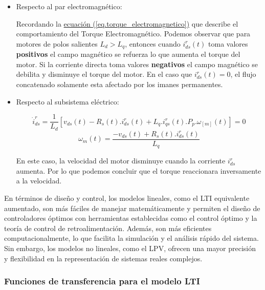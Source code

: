 \documentclass{article}
\begin{document}
\begin{itemize}
    
    \item Respecto al par electromagnético:
    
    Recordando la
    \hyperref[eq.torque_electromagnetico]{ecuación (\ref*{eq.torque_electromagnetico})}
    que describe el comportamiento del Torque Electromagnético.
    Podemos observar que para motores de polos salientes $L_{d} > L_{q}$, entonces cuando $i_{ds}^r(t)$
    toma valores \textbf{positivos} el campo magnético se refuerza lo que aumenta el torque del
    motor. Si la corriente directa toma valores \textbf{negativos} el campo magnético se debilita 
    y disminuye el torque del motor. En el caso que $i_{ds}^r(t) = 0$, el flujo concatenado solamente esta afectado por 
    los imanes permanentes.

    \item Respecto al subsistema eléctrico:

    \begin{equation}
        \dot{i}_{ds}^r = \frac{1}{L_{d}}[v_{ds}(t) - R_{s}(t).i_{ds}^r(t) + L_{q}.i_{qs}^r(t).P_{p}.\omega_[m](t)] = 0
    \end{equation}
    \begin{equation}
        \omega_{m}(t) = \frac{-v_{ds}(t) + R_{s}(t).i_{ds}^r(t)}{L_{q}}
    \end{equation}

    En este caso, la velocidad del motor disminuye cuando la corriente $i_{ds}^r$ 
    aumenta. Por lo que podemos concluir que el torque reaccionara inversamente 
    a la velocidad.

\end{itemize}

En términos de diseño y control, los modelos lineales, como el LTI equivalente aumentado, son más 
fáciles de manejar matemáticamente y permiten el diseño de controladores óptimos con herramientas 
establecidas como el control óptimo y la teoría de control de retroalimentación. Además, son más 
eficientes computacionalmente, lo que facilita la simulación y el análisis rápido del sistema. Sin 
embargo, los modelos no lineales, como el LPV, ofrecen una mayor precisión y flexibilidad en la 
representación de sistemas reales complejos.


\subsubsection{Funciones de transferencia para el modelo LTI}
\end{document}
